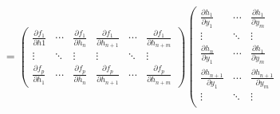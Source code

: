 \documentclass[main.tex]{subfiles}
\begin{document}
\begin{example}
\begin{align*}
                                                                                                 & =\left(\begin{array}{cccccc}
                                                                                                                  \frac{\partial f_1}{\partial h1}  & \cdots & \frac{\partial f_1}{\partial h_n} & \frac{\partial f_1}{\partial h_{n+1}} & \cdots & \frac{\partial f_1}{\partial h_{n+m}} \\
                                                                                                                  \vdots                            & \ddots & \vdots                            & \vdots                                & \ddots & \vdots                                \\
                                                                                                                  \frac{\partial f_p}{\partial h_1} & \cdots & \frac{\partial f_p}{\partial h_n} & \frac{\partial f_p}{\partial h_{n+1}} & \cdots & \frac{\partial f_p}{\partial h_{n+m}}
                                                                                                              \end{array}\right)\left(\begin{array}{ccc}
                                                                                                                                          \frac{\partial h_1}{\partial y_1}     & \cdots & \frac{\partial h_1}{\partial y_m}     \\
                                                                                                                                          \vdots                                & \ddots & \vdots                                \\
                                                                                                                                          \frac{\partial h_n}{\partial y_1}     & \cdots & \frac{\partial h_1}{\partial y_m}     \\
                                                                                                                                          \frac{\partial h_{n+1}}{\partial y_1} & \cdots & \frac{\partial h_{n+1}}{\partial y_m} \\
                                                                                                                                          \vdots                                & \ddots & \vdots                                \\

\end{array}
\end{align*}
\end{example}
\end{document}
